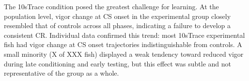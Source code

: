 The 10sTrace condition posed the greatest challenge for learning. At the population level, vigor change at CS onset in the experimental group closely resembled that of controls across all phases, indicating a failure to develop a consistent CR.
Individual data confirmed this trend: most 10sTrace experimental fish had vigor change at CS onset trajectories indistinguishable from controls. A small minority (X of XXX fish) displayed a weak tendency toward reduced vigor during late conditioning and early testing, but this effect was subtle and not representative of the group as a whole.

